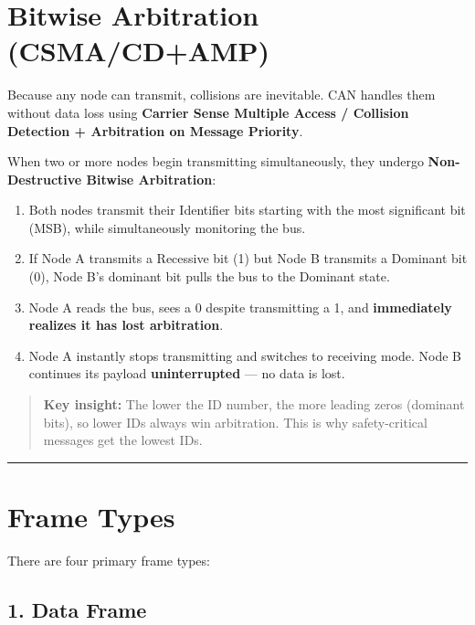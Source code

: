 \documentclass[12pt,a4paper,oneside]{report}
\providecommand{\tightlist}{\setlength{\itemsep}{0pt}\setlength{\parskip}{0pt}}
\begin{document}
\section{Bitwise Arbitration (CSMA/CD+AMP)}\label{bitwise-arbitration-csmacdamp}

Because any node can transmit, collisions are inevitable. CAN handles them
without data loss using \textbf{Carrier Sense Multiple Access / Collision
Detection + Arbitration on Message Priority}.

When two or more nodes begin transmitting simultaneously, they undergo
\textbf{Non-Destructive Bitwise Arbitration}:

\begin{enumerate}
\def\labelenumi{\arabic{enumi}.}
\tightlist
\item
  Both nodes transmit their Identifier bits starting with the most significant
  bit (MSB), while simultaneously monitoring the bus.
\item
  If Node A transmits a Recessive bit (1) but Node B transmits a Dominant bit
  (0), Node B's dominant bit pulls the bus to the Dominant state.
\item
  Node A reads the bus, sees a 0 despite transmitting a 1, and
  \textbf{immediately realizes it has lost arbitration}.
\item
  Node A instantly stops transmitting and switches to receiving mode. Node B
  continues its payload \textbf{uninterrupted} --- no data is lost.
\end{enumerate}

\begin{quote}
\textbf{Key insight:} The lower the ID number, the more leading zeros (dominant
bits), so lower IDs always win arbitration. This is why safety-critical messages
get the lowest IDs.
\end{quote}

\begin{center}\rule{0.5\linewidth}{0.5pt}\end{center}

\section{Frame Types}\label{frame-types}

There are four primary frame types:

\subsection{1. Data Frame}\label{data-frame}
\end{document}
